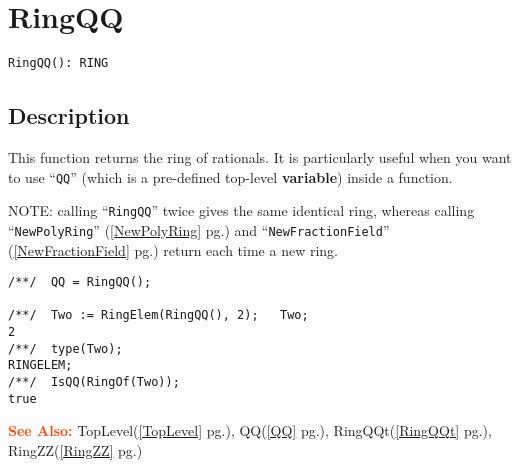 \documentclass[a4paper]{mybook}
\newenvironment{command}{}{} %
\newcommand\SeeAlso{\par\textcolor{OrangeRed}{\textbf{\large See Also: }}}
\begin{document}
\section{RingQQ}
\label{RingQQ}
\begin{command} %


\begin{Verbatim}[label=syntax, rulecolor=\color{MidnightBlue},
frame=single]
RingQQ(): RING
\end{Verbatim}


\subsection*{Description}

This function returns the ring of rationals.
It is particularly useful when you want to use ``\verb&QQ&''
(which is a pre-defined top-level \textbf{variable}) inside a function.
\par 
NOTE: calling ``\verb&RingQQ&'' twice gives the same identical ring,
whereas calling ``\verb&NewPolyRing&'' (\ref{NewPolyRing} pg.\pageref{NewPolyRing}) and ``\verb&NewFractionField&'' (\ref{NewFractionField} pg.\pageref{NewFractionField})
return each time a new ring.
\begin{Verbatim}[label=example, rulecolor=\color{PineGreen}, frame=single]
/**/  QQ = RingQQ();

/**/  Two := RingElem(RingQQ(), 2);   Two;
2
/**/  type(Two);
RINGELEM;
/**/  IsQQ(RingOf(Two));
true
\end{Verbatim}


\SeeAlso %
  TopLevel(\ref{TopLevel} pg.\pageref{TopLevel}), 
    QQ(\ref{QQ} pg.\pageref{QQ}), 
    RingQQt(\ref{RingQQt} pg.\pageref{RingQQt}), 
    RingZZ(\ref{RingZZ} pg.\pageref{RingZZ})
\end{command} %
\end{document}
